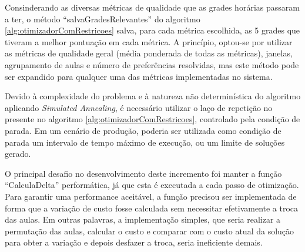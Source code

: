 Consinderando as diversas métricas de qualidade que as grades horárias passaram a ter, o método ``salvaGradesRelevantes'' do algoritmo \ref{alg:otimizadorComRestricoes} salva, para cada métrica escolhida, as 5 grades que tiveram a melhor pontuação em cada métrica. A princípio, optou-se por utilizar as métricas de qualidade geral (média ponderada de todas as métricas), janelas, agrupamento de aulas e número de preferências resolvidas, mas este método pode ser expandido para qualquer uma das métricas implementadas no sistema.

Devido à complexidade do problema e à natureza não determinística do algoritmo aplicando \textit{Simulated Annealing}, é necessário utilizar o laço de repetição no presente no algoritmo \ref{alg:otimizadorComRestricoes}, controlado pela condição de parada. Em um cenário de produção, poderia ser utilizada como condição de parada um intervalo de tempo máximo de execução, ou um limite de soluções gerado.

O principal desafio no desenvolvimento deste incremento foi manter a função ``CalculaDelta'' performática, já que esta é executada a cada passo de otimização. Para garantir uma performance aceitável, a função precisou ser implementada de forma que a variação de custo fosse calculada sem necessitar efetivamente a troca das aulas. Em outras palavras, a implementação simples, que seria realizar a permutação das aulas, calcular o custo e comparar com o custo atual da solução para obter a variação e depois desfazer a troca, seria ineficiente demais.
